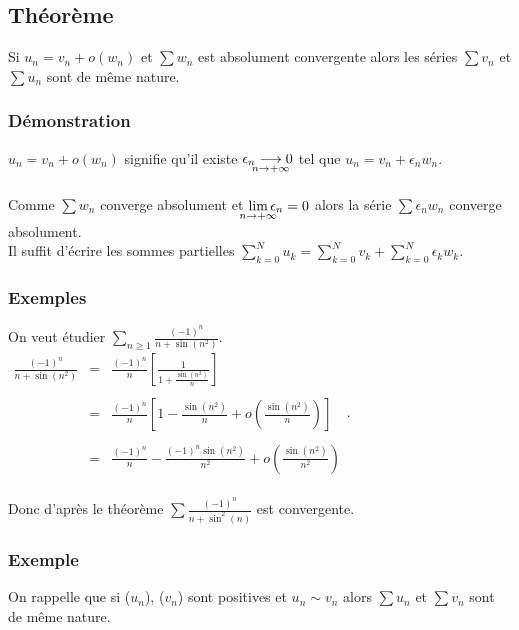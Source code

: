 \documentclass[a4paper,10pt]{book} %
\newcommand{\displayAmath}{\displaystyle}
\newcommand{\lime}[4]{#1\underset{\mathclap{#2 \rightarrow #3}}{\longrightarrow} #4}
\begin{document}
\subsection*{Théorème}
Si $u_n=v_n+o(w_n)$ et $\displayAmath\sum w_n$ est absolument convergente alors les séries $\displayAmath\sum v_n$ et $\displayAmath\sum u_n$ sont de même nature.

\subsubsection{Démonstration}
$u_n=v_n+o(w_n)$ signifie qu'il existe $\lime{\epsilon_n}{n}{+\infty}{0}$ tel que $u_n=v_n+\epsilon_nw_n$.\\\\
Comme $\displayAmath\sum w_n$ converge absolument et $\lim\limits_{\mathclap{n\rightarrow+\infty}}\epsilon_n=0$ alors la série $\displayAmath\sum \epsilon_nw_n$ converge absolument.\\

Il suffit d'écrire les sommes partielles $\displayAmath\sum_{k=0}^N u_k=\sum_{k=0}^Nv_k+\sum_{k=0}^N\epsilon_kw_k$.

\subsubsection{Exemples}
On veut étudier $\displayAmath\sum_{n\geq 1}\frac{(-1)^n}{n+\sin(n^2)}$.\\

$\begin{array}{rcl}\displayAmath\frac{(-1)^n}{n+\sin(n^2)}&=&\displayAmath\frac{(-1)^n}{n}\left[\frac{1}{1+\frac{\sin(n^2)}{n}}\right]\\\\
&=&\displayAmath\frac{(-1)^n}{n}\left[1-\frac{\sin(n^2)}{n}+o(\frac{\sin(n^2)}{n})\right]\\\\
&=&\displayAmath \frac{(-1)^n}{n}-\frac{(-1)^n\sin(n^2)}{n^2}+o(\frac{\sin(n^2)}{n^2})\end{array}$.\\\\

Donc d'après le théorème $\displayAmath\sum \frac{(-1)^n}{n+\sin^2(n)}$ est convergente.

\subsubsection{Exemple}
On rappelle que si ($u_n$), ($v_n$) sont positives et $u_n\sim v_n$ alors $\displayAmath\sum u_n$ et $\displayAmath\sum v_n$ sont de même nature.\\
\end{document}
